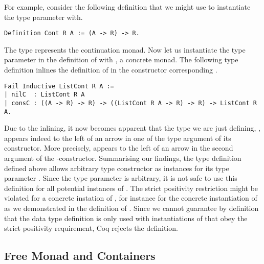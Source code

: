 For example, consider the following definition that we might use to
instantiate the type parameter with.

\begin{verbatim}
Definition Cont R A := (A -> R) -> R.
\end{verbatim}

The type  represents the continuation monad.
Now let us instantiate the type parameter  in the definition
of  with , a concrete monad.
The following type definition  inlines the definition
of  in the constructor corresponding .

\begin{verbatim}
Fail Inductive ListCont R A :=
| nilC  : ListCont R A
| consC : ((A -> R) -> R) -> ((ListCont R A -> R) -> R) -> ListCont R A.
\end{verbatim}

Due to the inlining, it now becomes apparent that the type we are just
defining, , appears indeed to the left of an arrow in
one of the type argument of its constructor.
More precisely,  appears to the left of an arrow in the
second argument of the -constructor.
Summarising our findings, the type definition  defined
above allows arbitrary type constructor as instances for its type
parameter .
Since the type parameter is arbitrary, it is not safe to use this
definition for all potential instances of .
The strict positivity restriction might be violated for a concrete
instation of , for instance for the concrete instantiation of
 as we demonstrated in the definition of .
Since we cannot guarantee by definition that the data type definition
 is only used with instantiations of  that obey the
strict positivity requirement, Coq rejects the definition.

\subsection{Free Monad and Containers}

